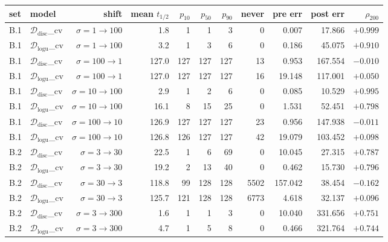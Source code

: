 \documentclass[11pt]{article}
\begin{document}
\begin{table}[H]
\centering
\scriptsize
\begin{tabular}{llrrrrrrrrr}
\hline
set & model & shift & mean $t_{1/2}$ & $p_{10}$ & $p_{50}$ & $p_{90}$ & never & pre err & post err & $\rho_{200}$ \\
\hline
B.1 & $\mathcal{D}_{\mathrm{disc}}$\_cv & $\sigma{=}1 \to 100$  &   1.8 &   1 &   1 &   3 &    0 &   0.007 &  17.866 & $+0.999$ \\
B.1 & $\mathcal{D}_{\mathrm{logu}}$\_cv & $\sigma{=}1 \to 100$  &   3.2 &   1 &   3 &   6 &    0 &   0.186 &  45.075 & $+0.910$ \\
B.1 & $\mathcal{D}_{\mathrm{disc}}$\_cv & $\sigma{=}100 \to 1$  & 127.0 & 127 & 127 & 127 &   13 &   0.953 & 167.554 & $-0.010$ \\
B.1 & $\mathcal{D}_{\mathrm{logu}}$\_cv & $\sigma{=}100 \to 1$  & 127.0 & 127 & 127 & 127 &   16 &  19.148 & 117.001 & $+0.050$ \\
B.1 & $\mathcal{D}_{\mathrm{disc}}$\_cv & $\sigma{=}10 \to 100$ &   2.9 &   1 &   2 &   6 &    0 &   0.085 &  10.529 & $+0.995$ \\
B.1 & $\mathcal{D}_{\mathrm{logu}}$\_cv & $\sigma{=}10 \to 100$ &  16.1 &   8 &  15 &  25 &    0 &   1.531 &  52.451 & $+0.798$ \\
B.1 & $\mathcal{D}_{\mathrm{disc}}$\_cv & $\sigma{=}100 \to 10$ & 126.9 & 127 & 127 & 127 &   23 &   0.956 & 147.938 & $-0.011$ \\
B.1 & $\mathcal{D}_{\mathrm{logu}}$\_cv & $\sigma{=}100 \to 10$ & 126.8 & 126 & 127 & 127 &   42 &  19.079 & 103.452 & $+0.098$ \\
B.2 & $\mathcal{D}_{\mathrm{disc}}$\_cv & $\sigma{=}3 \to 30$   &  22.5 &   1 &   6 &  69 &    0 &  10.045 &  27.315 & $+0.787$ \\
B.2 & $\mathcal{D}_{\mathrm{logu}}$\_cv & $\sigma{=}3 \to 30$   &  19.2 &   2 &  13 &  40 &    0 &   0.462 &  15.730 & $+0.796$ \\
B.2 & $\mathcal{D}_{\mathrm{disc}}$\_cv & $\sigma{=}30 \to 3$   & 118.8 &  99 & 128 & 128 & 5502 & 157.042 &  38.454 & $-0.162$ \\
B.2 & $\mathcal{D}_{\mathrm{logu}}$\_cv & $\sigma{=}30 \to 3$   & 125.7 & 121 & 128 & 128 & 6773 &   4.618 &  32.137 & $+0.096$ \\
B.2 & $\mathcal{D}_{\mathrm{disc}}$\_cv & $\sigma{=}3 \to 300$  &   1.6 &   1 &   1 &   3 &    0 &  10.040 & 331.656 & $+0.751$ \\
B.2 & $\mathcal{D}_{\mathrm{logu}}$\_cv & $\sigma{=}3 \to 300$  &   4.7 &   1 &   5 &   8 &    0 &   0.466 & 321.764 & $+0.744$ \\

\end{tabular}
\end{table}
\end{document}
